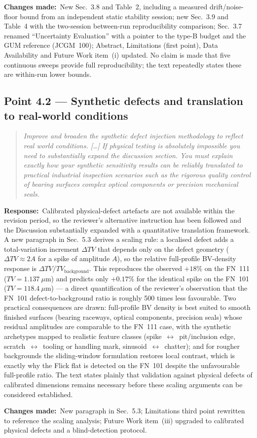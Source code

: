 \documentclass[11pt,a4paper]{article}
\newenvironment{reviewercomment}%
{\par\medskip\noindent\begin{quotation}\itshape\color{black!70}}%
{\end{quotation}\medskip}
\newcommand{\response}{\par\noindent\textbf{Response:}\ }
\newcommand{\changes}{\par\noindent\textbf{Changes made:}\ }
\begin{document}
\changes New Sec.~3.8 and Table~2, including a measured drift/noise-floor bound from an independent static stability session; new Sec.~3.9 and Table~4 with the two-session between-run reproducibility comparison; Sec.~3.7 renamed ``Uncertainty Evaluation'' with a pointer to the type-B budget and the GUM reference (JCGM~100); Abstract, Limitations (first point), Data Availability and Future Work item~(i) updated. No claim is made that five continuous sweeps provide full reproducibility; the text repeatedly states these are within-run lower bounds.

\subsection*{Point 4.2 --- Synthetic defects and translation to real-world conditions}
\begin{reviewercomment}
Improve and broaden the synthetic defect injection methodology to reflect real world conditions. [\ldots] If physical testing is absolutely impossible you need to substantially expand the discussion section. You must explain exactly how your synthetic sensitivity results can be reliably translated to practical industrial inspection scenarios such as the rigorous quality control of bearing surfaces complex optical components or precision mechanical seals.
\end{reviewercomment}
\response Calibrated physical-defect artefacts are not available within the revision period, so the reviewer's alternative instruction has been followed and the Discussion substantially expanded with a quantitative translation framework. A new paragraph in Sec.~5.3 derives a scaling rule: a localised defect adds a total-variation increment $\Delta TV$ that depends only on the defect geometry ($\Delta TV\approx 2A$ for a spike of amplitude $A$), so the relative full-profile BV-density response is $\Delta TV/TV_{\mathrm{background}}$. This reproduces the observed $+18\%$ on the FN~111 ($TV=1.137~\mu$m) and predicts only $+0.17\%$ for the identical spike on the FN~101 ($TV=118.4~\mu$m) --- a direct quantification of the reviewer's observation that the FN~101 defect-to-background ratio is roughly 500 times less favourable. Two practical consequences are drawn: full-profile BV density is best suited to smooth finished surfaces (bearing raceways, optical components, precision seals) whose residual amplitudes are comparable to the FN~111 case, with the synthetic archetypes mapped to realistic feature classes (spike~$\leftrightarrow$~pit/inclusion edge, scratch~$\leftrightarrow$~tooling or handling mark, sinusoid~$\leftrightarrow$~chatter); and for rougher backgrounds the sliding-window formulation restores local contrast, which is exactly why the Flick flat is detected on the FN~101 despite the unfavourable full-profile ratio. The text states plainly that validation against physical defects of calibrated dimensions remains necessary before these scaling arguments can be considered established.
\changes New paragraph in Sec.~5.3; Limitations third point rewritten to reference the scaling analysis; Future Work item~(iii) upgraded to calibrated physical defects and a blind-detection protocol.
\end{document}
